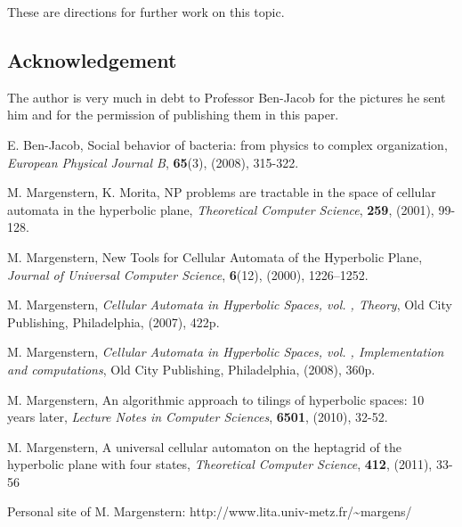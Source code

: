 \documentclass{article}
\begin{document}
   These are directions for further work on this topic.

\subsection*{Acknowledgement}
The author is very much in debt to Professor Ben-Jacob for the pictures
he sent him and for the permission of publishing them in this paper.

\begin{thebibliography}{5}
E. Ben-Jacob,
Social behavior of bacteria: from physics to complex organization,
{\it European Physical Journal B}, {\bf 65}(3), (2008), 315-322.

M. Margenstern, K. Morita,
NP problems are tractable in the space of cellular automata in the
hyperbolic plane,
{\it Theoretical Computer Science},
{\bf 259}, (2001), 99-128.

M. Margenstern,
New Tools for Cellular Automata of the Hyperbolic Plane,
{\it Journal of Universal Computer Science},
{\bf 6}(12), (2000), 1226--1252.

M. Margenstern,
{\it Cellular Automata in Hyperbolic Spaces, vol. , Theory},
Old City Publishing, Philadelphia, (2007), 422p.

M. Margenstern,
{\it Cellular Automata in Hyperbolic Spaces, vol. , Implementation and
computations},
Old City Publishing, Philadelphia, (2008), 360p.

M. Margenstern,
An algorithmic approach to tilings of hyperbolic spaces:
10 years later,
{\it Lecture Notes in Computer Sciences}, {\bf 6501}, (2010), 32-52.

M. Margenstern,
A universal cellular automaton on the heptagrid of the hyperbolic plane with four states,
{\it Theoretical Computer Science}, {\bf 412}, (2011), 33-56

Personal site of M. Margenstern:\vskip 0pt
http://www.lita.univ-metz.fr/\~{}margens/

\end{thebibliography}
\end{document}
